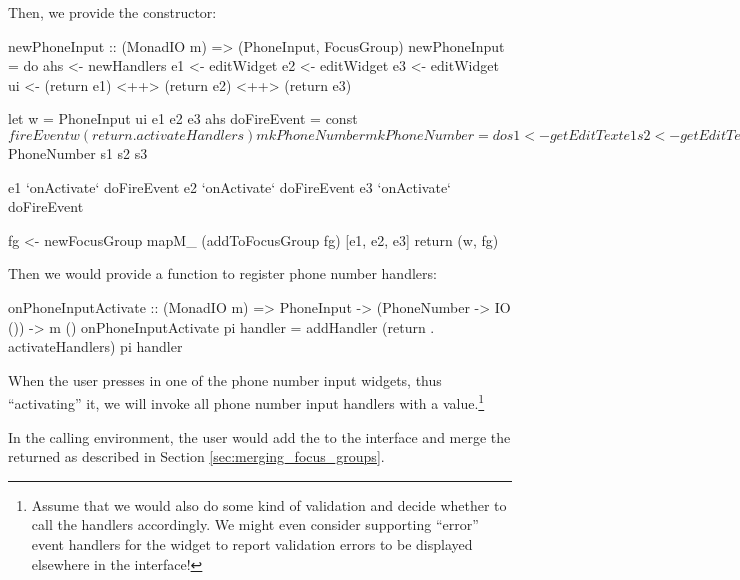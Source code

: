 Then, we provide the constructor:

\begin{haskellcode}
 newPhoneInput :: (MonadIO m) => (PhoneInput, FocusGroup)
 newPhoneInput = do
   ahs <- newHandlers
   e1 <- editWidget
   e2 <- editWidget
   e3 <- editWidget
   ui <- (return e1) <++> (return e2) <++> (return e3)

   let w = PhoneInput ui e1 e2 e3 ahs
       doFireEvent = const $
         fireEvent w (return . activateHandlers) mkPhoneNumber

       mkPhoneNumber = do
         s1 <- getEditText e1
         s2 <- getEditText e2
         s3 <- getEditText e3
         return $ PhoneNumber s1 s2 s3

   e1 `onActivate` doFireEvent
   e2 `onActivate` doFireEvent
   e3 `onActivate` doFireEvent

   fg <- newFocusGroup
   mapM_ (addToFocusGroup fg) [e1, e2, e3]
   return (w, fg)
\end{haskellcode}

Then we would provide a function to register phone number handlers:

\begin{haskellcode}
 onPhoneInputActivate :: (MonadIO m) => PhoneInput
                      -> (PhoneNumber -> IO ()) -> m ()
 onPhoneInputActivate pi handler =
   addHandler (return . activateHandlers) pi handler
\end{haskellcode}

When the user presses  in one of the phone number input
widgets, thus ``activating'' it, we will invoke all phone number input
handlers with a  value.\footnote{Assume that we would
  also do some kind of validation and decide whether to call the
  handlers accordingly.  We might even consider supporting ``error''
  event handlers for the widget to report validation errors to be
  displayed elsewhere in the interface!}

In the calling environment, the user would add the
 to the interface and merge the returned
 as described in Section
\ref{sec:merging_focus_groups}.
